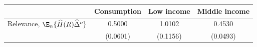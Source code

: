 \begin{threeparttable}
\begin{tabular}{l | ccc}
\toprule
 & \multicolumn{1}{c}{Consumption} & \multicolumn{1}{c}{Low income} & \multicolumn{1}{c}{Middle income} \\
\midrule
  Relevance, $\E_n\{\widehat{H}(R) \widehat{\Delta}^o\}$ & 0.5000 & 1.0102 & 0.4530 \\
           & (0.0601) & (0.1156) & (0.0493) \\
\bottomrule
\end{tabular}
\end{threeparttable}
